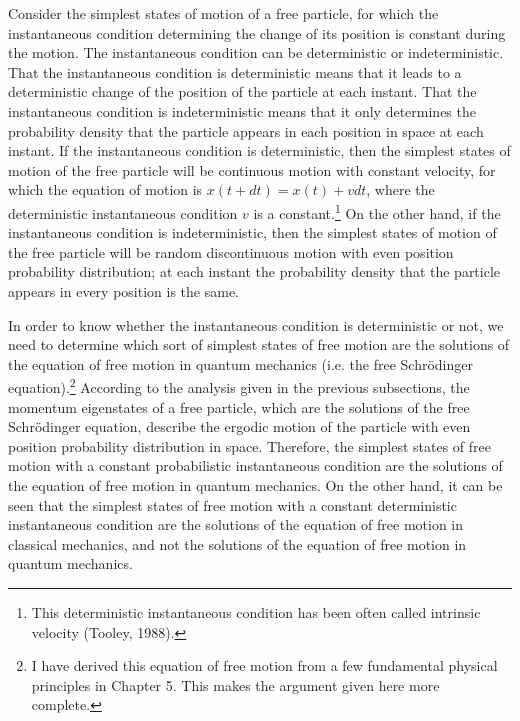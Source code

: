 Consider the simplest states of motion of a free particle, for which the instantaneous condition determining the change of its position is constant during the motion. The instantaneous condition can be deterministic or indeterministic. That the instantaneous condition is deterministic means that it leads to a deterministic change of the position of the particle at each instant. That the instantaneous condition is indeterministic means that it only determines the probability density that the particle appears in each position in space at each instant. If the instantaneous condition is deterministic, then the simplest states of motion of the free particle will be continuous motion with constant velocity, for which the equation of motion is $x(t+dt)=x(t)+vdt$, where the deterministic instantaneous condition $v$ is a constant.\footnote{This deterministic instantaneous condition has been often called intrinsic velocity (Tooley, 1988).} 
On the other hand, if the instantaneous condition is indeterministic, then the simplest states of motion of the free particle will be random discontinuous motion with even position probability distribution; at each instant the probability density that the particle appears in every position is the same.

In order to know whether the instantaneous condition is deterministic or not, we need to determine which sort of simplest states of free motion are the solutions of the equation of free motion in quantum mechanics (i.e. the free Schr\"{o}dinger equation).\footnote{I have derived this equation of free motion from a few fundamental physical principles in Chapter 5. This makes the argument given here more complete.} According to the analysis given in the previous subsections, the momentum eigenstates of a free particle, which are the solutions of the free Schr\"{o}dinger equation, describe the ergodic motion of the particle with even position probability distribution in space. Therefore, the simplest states of free motion with a constant probabilistic instantaneous condition are the solutions of the equation of free motion in quantum mechanics. On the other hand, it can be seen that the simplest states of free motion with a constant deterministic instantaneous condition are the solutions of the equation of free motion in classical mechanics, and not the solutions of the equation of free motion in quantum mechanics.

